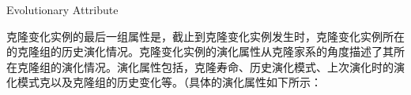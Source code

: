 
{Evolutionary Attribute}

克隆变化实例的最后一组属性是，截止到克隆变化实例发生时，克隆变化实例所在的克隆组的历史演化情况。克隆变化实例的演化属性从克隆家系的角度描述了其所在克隆组的演化情况。演化属性包括，克隆寿命、历史演化模式、上次演化时的演化模式克以及克隆组的历史变化等。（具体的演化属性如下所示：

